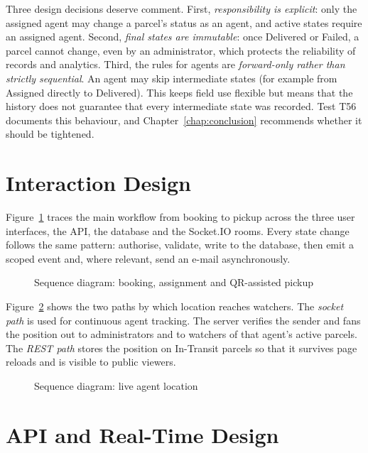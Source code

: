 Three design decisions deserve comment. First, \emph{responsibility is explicit}: only the assigned agent may change a parcel's status as an agent, and active states require an assigned agent. Second, \emph{final states are immutable}: once Delivered or Failed, a parcel cannot change, even by an administrator, which protects the reliability of records and analytics. Third, the rules for agents are \emph{forward-only rather than strictly sequential}. An agent may skip intermediate states (for example from Assigned directly to Delivered). This keeps field use flexible but means that the history does not guarantee that every intermediate state was recorded. Test T56 documents this behaviour, and Chapter~\ref{chap:conclusion} recommends whether it should be tightened.

\section{Interaction Design}
\label{sec:sequences}

Figure~\ref{fig:seq-booking} traces the main workflow from booking to pickup across the three user interfaces, the API, the database and the Socket.IO rooms. Every state change follows the same pattern: authorise, validate, write to the database, then emit a scoped event and, where relevant, send an e-mail asynchronously.

\begin{figure}[htbp]
\centering
\resizebox{\textwidth}{!}{}
\caption{Sequence diagram: booking, assignment and QR-assisted pickup}
\label{fig:seq-booking}
\end{figure}

Figure~\ref{fig:seq-location} shows the two paths by which location reaches watchers. The \emph{socket path} is used for continuous agent tracking. The server verifies the sender and fans the position out to administrators and to watchers of that agent's active parcels. The \emph{REST path} stores the position on In-Transit parcels so that it survives page reloads and is visible to public viewers.

\begin{figure}[htbp]
\centering
\resizebox{\textwidth}{!}{}
\caption{Sequence diagram: live agent location}
\label{fig:seq-location}
\end{figure}

\section{API and Real-Time Design}
\label{sec:design-api}

